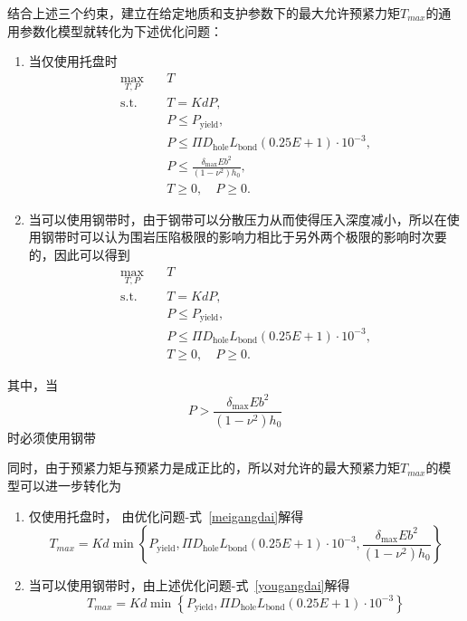 \documentclass[UTF-8,a4paper,zihao=-4]{ctexart}
\begin{document}
 结合上述三个约束，建立在给定地质和支护参数下的最大允许预紧力矩$T_{max}$的通用参数化模型就转化为下述优化问题：
 \begin{enumerate}
     \item 当仅使用托盘时
     \begin{equation}
\begin{aligned}
    \max_{T,P}\quad & T \\[1mm]
    \mathrm{s.t.}\quad
    & T = KdP,\\
    & P \leq P_{\mathrm{yield}},\\
    & P \leq
    \Pi D_{\mathrm{hole}}
    L_{\mathrm{bond}}
    (0.25E+1) \cdot 10^{-3},\\
    & P \leq
    \frac{\delta_{\max}Eb^2}
    {(1-\nu^2)h_0},\\
    & T \geq 0,\quad P \geq 0.
\end{aligned}
\label{meigangdai}
\end{equation}

\item 当可以使用钢带时，由于钢带可以分散压力从而使得压入深度减小，所以在使用钢带时可以认为围岩压陷极限的影响力相比于另外两个极限的影响时次要的，因此可以得到
\begin{equation}
\begin{aligned}
    \max_{T,P}\quad & T \\[1mm]
    \mathrm{s.t.}\quad
    & T = KdP,\\
    & P \leq P_{\mathrm{yield}},\\
    & P \leq
    \Pi D_{\mathrm{hole}}
    L_{\mathrm{bond}}
    (0.25E+1) \cdot 10^{-3},\\
    & T \geq 0,\quad P \geq 0.
\end{aligned}
\label{yougangdai}
\end{equation}
\end{enumerate}

其中，当\[P > \frac{\delta_{\max}Eb^2}{(1-\nu^2)h_0}\]时必须使用钢带

同时，由于预紧力矩与预紧力是成正比的，所以对允许的最大预紧力矩$T_{max}$的模型可以进一步转化为
\begin{enumerate}
    \item 仅使用托盘时，
    由优化问题-式~\ref{meigangdai}解得
    \begin{equation}
        T_{max}=Kd\min
    \left\{
    P_{\mathrm{yield}},
    \Pi D_{\mathrm{hole}}
    L_{\mathrm{bond}}
    (0.25E+1) \cdot 10^{-3},
    \frac{\delta_{\max}Eb^2}
    {(1-\nu^2)h_0}
    \right\}
    \label{jieguo}
    \end{equation}
    \item 当可以使用钢带时，由上述优化问题-式~\ref{yougangdai}解得
    \begin{equation}
        T_{max}=Kd\min
    \left\{
    P_{\mathrm{yield}},
    \Pi D_{\mathrm{hole}}
    L_{\mathrm{bond}}
    (0.25E+1) \cdot 10^{-3}
    \right\}
    \end{equation}
    \end{enumerate}
    
\end{document}
